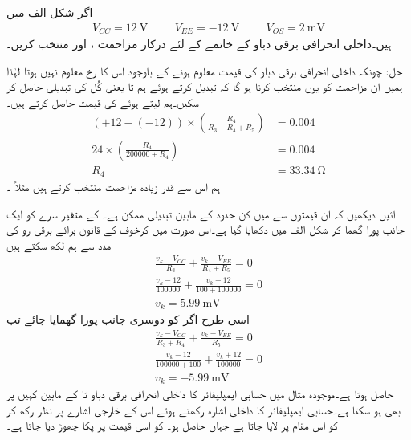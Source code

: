 اگر شکل  الف میں
\begin{align*}
V_{CC} =\SI{12}{\volt} \hspace{1cm} V_{EE}=\SI{-12}{\volt} \hspace{1cm} V_{OS}=\SI{2}{\milli \volt}
\end{align*}
ہیں۔داخلی انحرافی برقی دباو کے خاتمے کے لئے درکار مزاحمت ،  اور  منتخب کریں۔

حل:	چونکہ داخلی انحرافی برقی دباو کی قیمت معلوم ہونے کے باوجود اس کا رخ معلوم نہیں ہوتا لہٰذا ہمیں ان مزاحمت کو یوں منتخب کرنا ہو گا کہ  تبدیل کرتے ہوئے ہم  تا  یعنی کُل  کی تبدیلی حاصل کر سکیں۔ہم لیتے ہوئے  کی قیمت حاصل کرتے ہیں۔
\begin{align*}
 \left(+12-(-12) \right ) \times \left (\frac{R_4}{R_3+R_4+R_5} \right )&=0.004\\
 24 \times \left ( \frac{R_4}{200000+R_4} \right )&=0.004\\
 R_4 &= \SI{33.34}{\ohm}
\end{align*}
ہم اس سے قدر زیادہ مزاحمت منتخب کرتے ہیں مثلاً ۔

آئیں دیکھیں کہ ان قیمتوں سے  میں کن حدود کے مابین تبدیلی ممکن ہے۔ کے متغیر سرے کو ایک جانب پورا گھما کر شکل  الف     میں دکھایا گیا ہے۔اس صورت میں کرخوف کے قانون برائے برقی رو کی مدد سے ہم لکھ سکتے ہیں
\begin{align*}
\frac{v_k-V_{CC}}{R_3}+\frac{v_k-V_{EE}}{R_4+R_5}=0\\
\frac{v_k-12}{100000}+\frac{v_k+12}{100+100000}=0\\
v_k=\SI{5.99}{\milli \volt}
\end{align*}
اسی طرح اگر  کو دوسری جانب پورا گھمایا جائے تب
\begin{align*}
\frac{v_k-V_{CC}}{R_3+R_4}+\frac{v_k-V_{EE}}{R_5}=0\\
\frac{v_k-12}{100000+100}+\frac{v_k+12}{100000}=0\\
v_k=-\SI{5.99}{\milli \volt}
\end{align*}
حاصل ہوتا ہے۔موجودہ مثال میں حسابی ایمپلیفائر کا داخلی انحرافی برقی دباو  تا کے مابین کہیں پر بھی ہو سکتا ہے۔حسابی ایمپلیفائر کا داخلی اشارہ  رکھتے ہوئے اس  کے خارجی اشارے   پر نظر رکھ کر  کو اس مقام پر لایا جاتا ہے جہاں  حاصل ہو۔ کو اسی قیمت پر پکا چھوڑ دیا جاتا ہے۔

